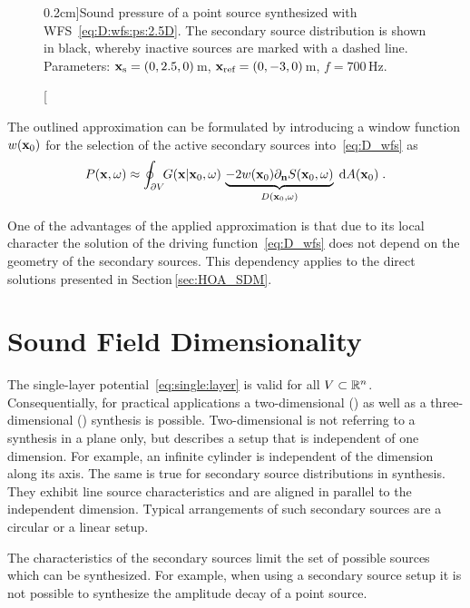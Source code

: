 \begin{figure}
    \small
    \centering
    
    \caption[][0.2cm]{Sound pressure of a point source synthesized with
    \ac{WFS}~\protect\eqref{eq:D:wfs:ps:2.5D}. The secondary source
        distribution is shown in black, whereby inactive sources are marked with a
        dashed line. Parameters: $\mathbf{x}_\text{s} = (0,2.5,0)$\,m,
        $\mathbf{x}_\text{ref} = (0,-3,0)$\,m, $f = 700$\,Hz.
        }
    \label{fig:concave_array}
\end{figure}

The outlined approximation can be formulated by
introducing a window function $w(\mathbf{x}_0)$ for the selection of the active
secondary sources into~\eqref{eq:D_wfs} as
%
\begin{equation}
    P(\x,\omega) \approx \oint_{\partial V} \!\!  G(\x|\x_0,\omega) \,
    \underbrace{-2 w(\x_0) \partial_\n S(\x_0,\omega)}_{D(\x_0,\omega)} \; \D
    A(\x_0) \qp
    \label{eq:P_wfs}
\end{equation}
%

One of the advantages of the applied approximation is that due to its local
character the solution of the driving function~\eqref{eq:D_wfs} does not depend on
the geometry of the secondary sources. This dependency applies to the direct
solutions presented in Section\,\ref{sec:HOA_SDM}.


\section{Sound Field Dimensionality}
\label{sec:sound_field_dimensionality}
%
The single-layer potential~\eqref{eq:single:layer} is valid for all $V
\subset \mathbb{R}^n$. Consequentially, for practical applications a two-dimensional
(\twoD) as well as a three-dimensional (\threeD) synthesis is possible.
Two-dimensional is not referring to a synthesis in a plane only, but describes a setup
that is independent of one dimension. For example, an infinite cylinder is
independent of the dimension along its axis. The same is true
for secondary source distributions in \twoD synthesis. They exhibit
line source characteristics and are aligned in parallel to
the independent dimension. Typical arrangements of such secondary sources are
a circular or a linear setup.

The characteristics of the secondary
sources limit the set of possible sources which can be synthesized. For example,
when using a \twoD secondary source setup it is not possible to synthesize the
amplitude decay of a point source.

